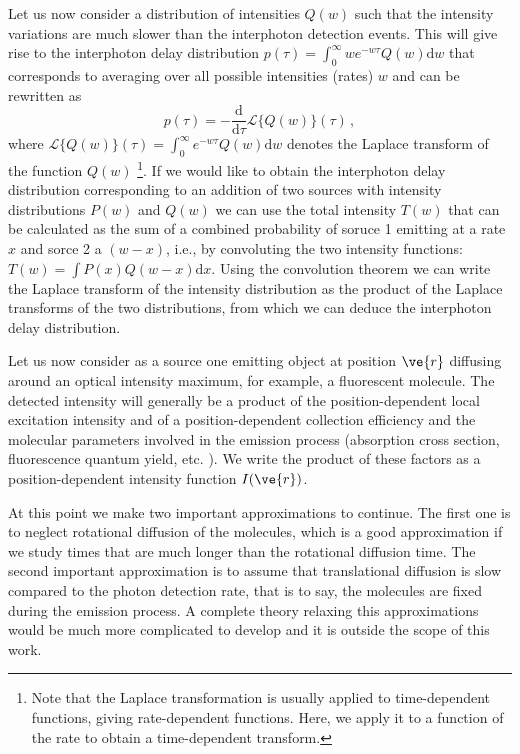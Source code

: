 Let us now consider a distribution of intensities $Q(w)$ such that the 
intensity variations are much slower than the interphoton detection events.
This will give rise to the interphoton delay distribution 
$p(\tau)=\int_0^\infty w e^{-w\tau}Q(w)\mbox{d}w$ that corresponds to 
averaging over all possible intensities (rates) $w$ and can be rewritten as
\begin{equation}
p(\tau)=-\frac{\mbox{d}}{\mbox{d}\tau}\mathscr{L}\{Q(w)\}(\tau)\,,
\label{eq:interphoton_delay_distribution}
\end{equation} 
where $\mathscr{L}\{Q(w)\}(\tau)=\int_0^\infty e^{-w\tau}Q(w)\mbox{d}w$ denotes the 
Laplace transform of the function $Q(w)$ \footnote{Note that the Laplace transformation
is usually applied to time-dependent functions, giving rate-dependent functions. 
Here, we apply it to a function of the rate to obtain a time-dependent transform.}. 
If we would like to obtain the interphoton delay distribution 
corresponding to an addition of two sources with intensity distributions $P(w)$ and $Q(w)$ we can use the total intensity $T(w)$ that can be calculated as the sum 
of a combined probability of soruce 1 emitting at a rate $x$ and sorce 2 a 
$(w-x)$, i.e., by convoluting the two intensity functions: $T(w)=\int{P(x)Q(w-x)\mbox{d}x}$. 
Using the convolution theorem we can write the Laplace transform of the intensity distribution 
as the product of the Laplace transforms of the two distributions, from which we can deduce 
the interphoton delay distribution.

Let us now consider as a source one emitting object at position $\ve{r}$ 
diffusing around an optical intensity maximum, for example, a fluorescent molecule. 
The detected intensity will generally be a product of the position-dependent local 
excitation intensity and of a position-dependent collection efficiency and the 
molecular parameters involved in the emission process (absorption cross section, 
fluorescence quantum yield, etc. ). We write the product of these factors as a 
position-dependent intensity function $I(\ve{r})$.

At this point we make two important approximations to continue. The first one is 
to neglect rotational diffusion of the molecules, which is a good approximation 
if we study times that are much longer than the rotational diffusion time. The 
second important approximation is to assume that translational diffusion is slow
 compared to the photon detection rate, that is to say, the molecules are fixed 
during the emission process. A complete theory relaxing this approximations would 
be much more complicated to develop and it is outside the scope of this work.

